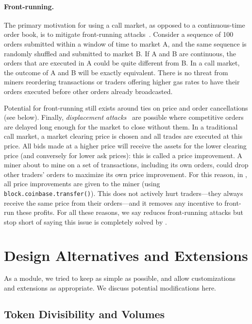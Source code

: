 \paragraph{Front-running.} The primary motivation for using a call market, as opposed to a continuous-time order book, is to mitigate front-running attacks~\cite{clark2014decentralizing,eskandari2019sok,daian2019flash}. Consider a sequence of 100 orders submitted within a window of time to market A, and the same sequence is randomly shuffled and submitted to market B. If A and B are continuous, the orders that are executed in A could be quite different from B. In a call market, the outcome of A and B will be exactly equivalent. There is no threat from miners reordering transactions or traders offering higher gas rates to have their orders executed before other orders already broadcasted. 

Potential for front-running still exists around ties on price and order cancellations (see below). Finally, \textit{displacement attacks}~\cite{eskandari2019sok} are possible where competitive orders are delayed long enough for the market to close without them. In a traditional call market, a market clearing price is chosen and all trades are executed at this price. All bids made at a higher price will receive the assets for the lower clearing price (and conversely for lower ask prices): this is called a price improvement. A miner about to mine on a set of transactions, including its own orders, could drop other traders' orders to maximize its own price improvement. For this reason, in \cm, all price improvements are given to the miner (using \texttt{block.coinbase.transfer()}). This does not actively hurt traders---they always receive the same price from their orders---and it removes any incentive to front-run these profits. For all these reasons, we say \cm reduces front-running attacks but stop short of saying this issue is completely solved by \cm. 


\section{Design Alternatives and Extensions}

As a module, we tried to keep \cm as simple as possible, and allow customizations and extensions as appropriate. We discuss potential modifications here.  

\subsection{Token Divisibility and Volumes} 

